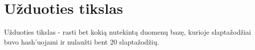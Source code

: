\section{Užduoties tikslas}
\label{sec:uzduoties_tikslas}

Užduoties tikslas - rasti bet kokią nutekintą duomenų bazę, kurioje slaptažodžiai buvo hash'uojami ir nulaužti bent 20 slaptažodžių.